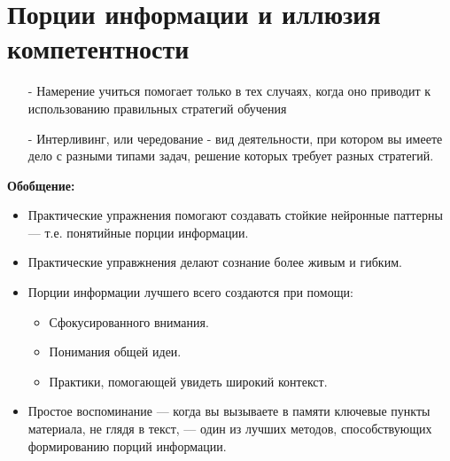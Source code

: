 \documentclass{article}
\begin{document}
\section{Порции информации и иллюзия компетентности}
\begin{itemize}
\item[-] Намерение учиться помогает только в тех случаях, когда оно приводит к использованию правильных стратегий обучения
\item[-] Интерливинг, или чередование - вид деятельности, при котором вы имеете дело с разными типами задач, решение которых требует разных стратегий.
\end{itemize}
\textbf{Обобщение:}
\begin{itemize}
\item Практические упражнения помогают создавать стойкие нейронные паттерны --- т.е. понятийные порции информации.
\item Практические управжнения делают сознание более живым и гибким.
\item Порции информации лучшего всего создаются при помощи:
\begin{itemize}
\item Сфокусированного внимания.
\item Понимания общей идеи.
\item Практики, помогающей увидеть широкий контекст.
\end{itemize}
\item Простое воспоминание --- когда вы вызываете в памяти ключевые пункты материала, не глядя в текст, --- один из лучших методов, способствующих формированию порций информации.
\end{itemize}
\end{document}
